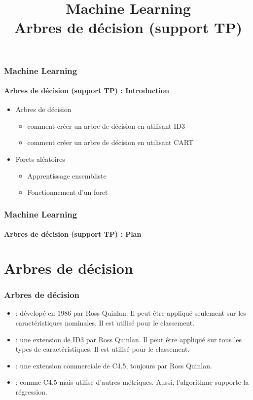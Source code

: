 \documentclass[xcolor=table]{beamer}
\title[ML : Arbres de décision (TP)] %
{Machine Learning \\Arbres de décision (support TP)}
\begin{document}
	
\begin{frame}
	\frametitle{Machine Learning}
	\framesubtitle{Arbres de décision (support TP) : Introduction}
	
	\begin{itemize}
		\item Arbres de décision
		\begin{itemize}
			\item comment créer un arbre de décision en utilisant ID3
			\item comment créer un arbre de décision en utilisant CART
		\end{itemize}
		\item Forets aléatoires 
		\begin{itemize}
			\item Apprentissage ensembliste
			\item Fonctionnement d'un foret
		\end{itemize}
	\end{itemize}
\end{frame}


\begin{frame}
	\frametitle{Machine Learning}
	\framesubtitle{Arbres de décision (support TP) : Plan}
	
	\begin{multicols}{2}
		\tableofcontents
	\end{multicols}
\end{frame}

\section{Arbres de décision}

\begin{frame}
	\frametitle{Arbres de décision}
	
	\begin{itemize}
		\item {} : dévelopé en 1986 par Ross Quinlan. Il peut être appliqué seulement sur les caractéristiques nominales. Il est utilisé pour le classement.
		\item {} : une extension de ID3 par Ross Quinlan. Il peut être appliqué sur tous les types de caractéristiques. Il est utilisé pour le classement.
		\item {} : une extension commerciale de C4.5, toujours par Ross Quinlan.
		\item {} : comme C4.5 mais utilise d'autres métriques. Aussi, l'algorithme supporte la régression.
	\end{itemize}
	
\end{frame}
\end{document}
